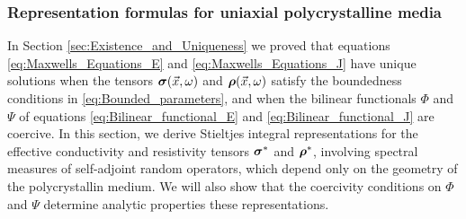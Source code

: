 \documentclass[11pt]{amsart}
\newcommand\bsig{\mbox{\boldmath${\sigma}$}}
\newcommand\brho{\mbox{\boldmath${\rho}$}}
\begin{document}
\subsubsection{Representation formulas for uniaxial polycrystalline
  media}\label{sec:Representation_formulas}
%
In Section \ref{sec:Existence_and_Uniqueness} we proved that equations
\eqref{eq:Maxwells_Equations_E} and \eqref{eq:Maxwells_Equations_J}
have unique solutions when the tensors $\bsig(\vec{x},\omega)$ and
$\brho(\vec{x},\omega)$ satisfy the boundedness conditions in
\eqref{eq:Bounded_parameters}, and when the bilinear functionals $\Phi$
and $\Psi$ of equations \eqref{eq:Bilinear_functional_E} and
\eqref{eq:Bilinear_functional_J} are coercive. In this section, we
derive Stieltjes integral representations for the effective
conductivity and resistivity tensors $\bsig^*$ and $\brho^*$, 
involving spectral measures of self-adjoint random operators, which
depend only on the geometry of the polycrystallin medium. We will also
show that the coercivity conditions on $\Phi$ and $\Psi$ determine analytic
properties these representations. 

 
\end{document}
